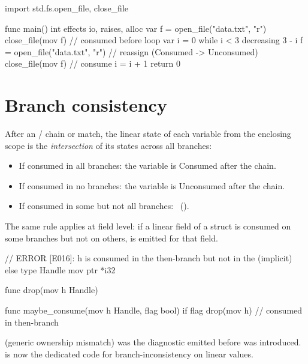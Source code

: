 \begin{example}
\begin{laincode}
import std.fs.{open_file, close_file}

func main() int effects io, raises, alloc {
    var f = open_file("data.txt", "r")
    close_file(mov f)        // consumed before loop
    var i = 0
    while i < 3 decreasing 3 - i {
        f = open_file("data.txt", "r")  // reassign (Consumed -> Unconsumed)
        close_file(mov f)               // consume
        i = i + 1
    }
    return 0
}
\end{laincode}
\end{example}

\section{Branch consistency}
\label{sec:own.branches}

\pnum
After an / chain or  match, the linear
state of each variable from the enclosing scope is the
\textit{intersection} of its states across all branches:

\begin{itemize}
  \item If consumed in all branches: the variable is Consumed after the chain.
  \item If consumed in no branches: the variable is Unconsumed after the chain.
  \item If consumed in some but not all branches: \illformed{}~().
\end{itemize}

\pnum
The same rule applies at field level: if a linear field of a struct is
consumed on some branches but not on others,  is emitted
for that field.

\begin{example}
\begin{laincode}
// ERROR [E016]: h is consumed in the then-branch but not in the (implicit) else
type Handle { mov ptr *i32 }

func drop(mov h Handle) { }

func maybe_consume(mov h Handle, flag bool) {
    if flag {
        drop(mov h)   // consumed in then-branch
    }
}
\end{laincode}
\end{example}

\begin{note}
   (generic ownership mismatch) was the diagnostic emitted
  before  was introduced.   is now the
  dedicated code for branch-inconsistency on linear values.
\end{note}

